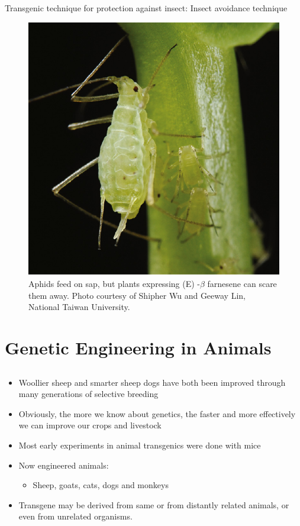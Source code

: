 \documentclass[11pt,dvipsnames,ignorenonframetext,aspectratio=169]{beamer}
\providecommand{\tightlist}{%
  \setlength{\itemsep}{0pt}\setlength{\parskip}{0pt}}
\begin{document}
\begin{frame}{Transgenic technique for protection against insect: Insect
avoidance technique}
\protect\hypertarget{transgenic-technique-for-protection-against-insect-insect-avoidance-technique}{}
\begin{figure}
\includegraphics[width=0.4\linewidth]{../images/aphid_avoidance} \caption{Aphids feed on sap, but plants expressing (E) -$\beta$ farnesene can scare them away. Photo courtesy of Shipher Wu and Geeway Lin, National Taiwan University.}\label{fig:aphid-avoidance}
\end{figure}
\end{frame}

\hypertarget{genetic-engineering-in-animals}{%
\section{Genetic Engineering in
Animals}\label{genetic-engineering-in-animals}}

\hypertarget{section-5}{%
\subsection{}\label{section-5}}

\begin{frame}{}
\protect\hypertarget{section-6}{}
\begin{itemize}
\tightlist
\item
  Woollier sheep and smarter sheep dogs have both been improved through
  many generations of selective breeding
\item
  Obviously, the more we know about genetics, the faster and more
  effectively we can improve our crops and livestock
\item
  Most early experiments in animal transgenics were done with mice
\item
  Now engineered animals:

  \begin{itemize}
  \tightlist
  \item
    Sheep, goats, cats, dogs and monkeys
  \end{itemize}
\item
  Transgene may be derived from same or from distantly related animals,
  or even from unrelated organisms.
\end{itemize}
\end{frame}
\end{document}
